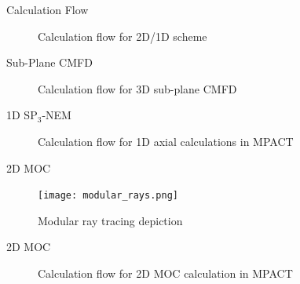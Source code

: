 
\begin{frame}[t]{Calculation Flow}

\begin{figure}[h]
    \centering
    \scalebox{0.4}{}
    \caption{Calculation flow for 2D/1D scheme}\label{f:2d1d-flowchart}
\end{figure}

\end{frame}


\begin{frame}[t]{Sub-Plane CMFD}
    
    \begin{figure}[h]
        \centering
        \scalebox{0.4}{}
        \caption{Calculation flow for 3D sub-plane CMFD}\label{f:CMFD-flowchart}
    \end{figure}
    
\end{frame}


\begin{frame}[t]{1D SP$_3$-NEM}
    
    \begin{figure}[h]
        \centering
        \scalebox{0.6}{}
        \caption{Calculation flow for 1D axial calculations in MPACT}\label{f:Axial-flowchart}
    \end{figure}
    
\end{frame}


\begin{frame}[t]{2D MOC}

\begin{figure}[h]
    \centering
    \texttt{[image: modular\_rays.png]}
    \caption[Modular Ray Tracing]{Modular ray tracing depiction \cite{MPACTTheoryManual}}\label{e:ModRays}
\end{figure}

\end{frame} 


\begin{frame}[t]{2D MOC}

\begin{figure}[h]
    \centering
    \scalebox{0.5}{}
    \caption{Calculation flow for 2D MOC calculation in MPACT}\label{f:MOC-flowchart}
\end{figure}

\end{frame} 